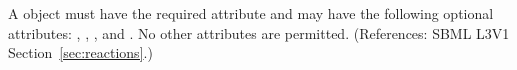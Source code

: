 A \LocalParameter object must have the required attribute 
 and may have the following optional attributes:
, , ,
 and .  
No other attributes are permitted.  
(References: SBML L3V1 Section~\ref{sec:reactions}.)
